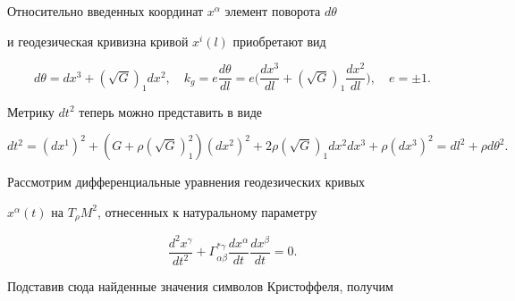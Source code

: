  


Относительно введенных координат $x^\alpha$ элемент поворота $d\theta$ 


и геодезическая кривизна кривой $x^i(l)$ приобретают вид 


$$ 


d\theta=d x^3+(\sqrt{G})_1d x^2,\quad 


k_g=e\frac{d\theta}{d l}=e 


\bigg(\frac{d x^3}{d l}+(\sqrt{G})_1 


\frac{d x^2}{d l} \bigg),\quad e=\pm1. 


$$ 


Метрику $d t^2$ теперь можно представить в виде 


$$ 


d t^2=(d x^1)^2+(G+\rho(\sqrt{G})^2_1)(d x^2)^2+ 


2\rho(\sqrt{G})_1d x^2d x^3+\rho(d x^3)^2= 


d l^2+\rho d\theta^2. 


$$ 


 


Рассмотрим дифференциальные уравнения геодезических кривых 


$x^\alpha(t)$ на $T_\rho M^2$, отнесенных к натуральному параметру 


\begin{equation} 


\frac{d^2x^\gamma}{d t^2}+\Gamma^{*\gamma}_{\alpha\beta} 


\frac{d x^\alpha}{d t}\frac{d x^\beta}{d t}=0. 


\end{equation} 


Подставив сюда найденные значения символов Кристоффеля, получим 


